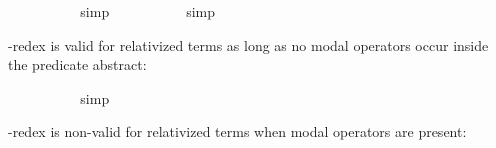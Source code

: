 \begin{isabellebody}
\isamarkupfalse%
\ {\isachardoublequoteopen}{\isasymlfloor}{\isacharparenleft}{\isacharparenleft}{\isasymlambda}{\isasymalpha}{\isachardot}\ \isactrlbold {\isasymbox}{\isasymphi}\ {\isasymalpha}{\isacharparenright}\ {\isacharparenleft}{\isasymtau}{\isacharcolon}{\isacharcolon}{\isasymup}{\isasymzero}{\isacharparenright}{\isacharparenright}\ \isactrlbold {\isasymleftrightarrow}\ {\isacharparenleft}\isactrlbold {\isasymbox}{\isasymphi}\ {\isasymtau}{\isacharparenright}{\isasymrfloor}{\isachardoublequoteclose}%
\ %
%
\isamarkupfalse%
\ simp%
%
%
\isanewline
{}\isamarkupfalse%
\ {\isachardoublequoteopen}{\isasymlfloor}{\isacharparenleft}{\isacharparenleft}{\isasymlambda}{\isasymalpha}{\isachardot}\ \isactrlbold {\isasymbox}{\isasymphi}\ {\isasymalpha}{\isacharparenright}\ {\isacharparenleft}{\isasymtau}{\isacharcolon}{\isacharcolon}{\isasymzero}{\isacharparenright}{\isacharparenright}\ \isactrlbold {\isasymleftrightarrow}\ {\isacharparenleft}\isactrlbold {\isasymbox}{\isasymphi}\ {\isasymtau}{\isacharparenright}{\isasymrfloor}{\isachardoublequoteclose}%
\ %
%
\isamarkupfalse%
\ simp%
%
%
%
\begin{isamarkuptext}%
\isa{{\isasymbeta}{\isasymeta}}-redex is valid for relativized terms as long as no modal operators occur inside the predicate abstract:%
\end{isamarkuptext}\isamarkuptrue%
\isamarkupfalse%
\ {\isachardoublequoteopen}{\isasymlfloor}{\isacharparenleft}{\isacharparenleft}{\isasymlambda}{\isasymalpha}{\isachardot}\ {\isasymphi}\ {\isasymalpha}{\isacharparenright}\ {\isasymdownharpoonleft}{\isacharparenleft}{\isasymtau}{\isacharcolon}{\isacharcolon}{\isasymup}{\isasymzero}{\isacharparenright}{\isacharparenright}\ \isactrlbold {\isasymleftrightarrow}\ {\isacharparenleft}{\isasymphi}\ {\isasymdownharpoonleft}{\isasymtau}{\isacharparenright}{\isasymrfloor}{\isachardoublequoteclose}%
\ %
%
\isamarkupfalse%
\ simp%
%
%
%
\begin{isamarkuptext}%
\isa{{\isasymbeta}{\isasymeta}}-redex is non-valid for relativized terms when modal operators are present:%
\end{isamarkuptext}\isamarkuptrue%
\isamarkupfalse%
\ {\isachardoublequoteopen}{\isasymlfloor}{\isacharparenleft}{\isacharparenleft}{\isasymlambda}{\isasymalpha}{\isachardot}\ \isactrlbold {\isasymbox}{\isasymphi}\ {\isasymalpha}{\isacharparenright}\ {\isasymdownharpoonleft}{\isacharparenleft}{\isasymtau}{\isacharcolon}{\isacharcolon}{\isasymup}{\isasymzero}{\isacharparenright}{\isacharparenright}\ \isactrlbold {\isasymleftrightarrow}\ {\isacharparenleft}\isactrlbold {\isasymbox}{\isasymphi}\ {\isasymdownharpoonleft}{\isasymtau}{\isacharparenright}{\isasymrfloor}{\isachardoublequoteclose}\ \isamarkupfalse%

\end{isabellebody}
